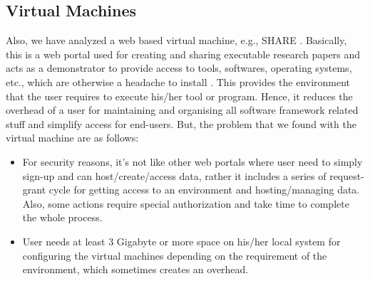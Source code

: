 \subsection{Virtual Machines}\label{subsec:virtualmachines}
Also, we have analyzed a web based virtual machine, e.g., SHARE \cite{share}. Basically, this is a web portal used for creating and sharing executable research papers and acts as a demonstrator to provide access to tools, softwares, operating systems, etc., which are otherwise a headache to install \cite{share}. 
\newline\newline This provides the environment that the user requires to execute his/her tool or program. Hence, it reduces the overhead of a user for maintaining and organising all software framework related stuff and simplify access for end-users.
\newline\newline But, the problem that we found with the virtual machine are as follows:
\begin{itemize}
	\item {For security reasons, it's not like other web portals where user need to simply sign-up and can host/create/access data, rather it includes a series of request-grant cycle for getting access to an environment and hosting/managing data. Also, some actions require special authorization and take time to complete the whole process.}
	\item {User needs at least 3 Gigabyte or more space on his/her local system for configuring the virtual machines depending on the requirement of the environment, which sometimes creates an overhead.}
\end{itemize}	

